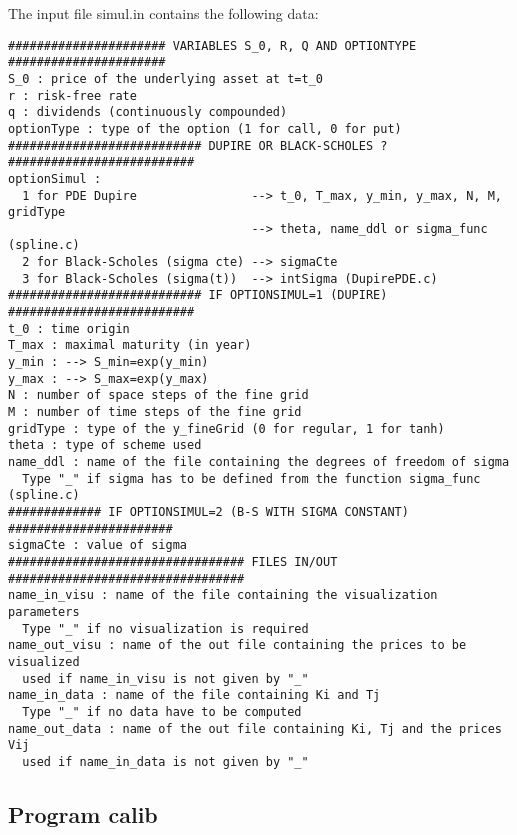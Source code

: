 \documentclass[12pt]{article}
\begin{document}
The input file simul.in contains the following data:
\begin{verbatim}
###################### VARIABLES S_0, R, Q AND OPTIONTYPE ######################
S_0 : price of the underlying asset at t=t_0
r : risk-free rate     
q : dividends (continuously compounded) 
optionType : type of the option (1 for call, 0 for put)  
########################### DUPIRE OR BLACK-SCHOLES ? ##########################
optionSimul :
  1 for PDE Dupire                --> t_0, T_max, y_min, y_max, N, M, gridType
                                  --> theta, name_ddl or sigma_func (spline.c)
  2 for Black-Scholes (sigma cte) --> sigmaCte
  3 for Black-Scholes (sigma(t))  --> intSigma (DupirePDE.c)
########################### IF OPTIONSIMUL=1 (DUPIRE) ##########################
t_0 : time origin
T_max : maximal maturity (in year)
y_min : --> S_min=exp(y_min)     
y_max : --> S_max=exp(y_max)
N : number of space steps of the fine grid
M : number of time steps of the fine grid
gridType : type of the y_fineGrid (0 for regular, 1 for tanh)
theta : type of scheme used
name_ddl : name of the file containing the degrees of freedom of sigma
  Type "_" if sigma has to be defined from the function sigma_func (spline.c)
############# IF OPTIONSIMUL=2 (B-S WITH SIGMA CONSTANT) #######################
sigmaCte : value of sigma
################################# FILES IN/OUT #################################
name_in_visu : name of the file containing the visualization parameters
  Type "_" if no visualization is required
name_out_visu : name of the out file containing the prices to be visualized
  used if name_in_visu is not given by "_"
name_in_data : name of the file containing Ki and Tj
  Type "_" if no data have to be computed
name_out_data : name of the out file containing Ki, Tj and the prices Vij
  used if name_in_data is not given by "_"
\end{verbatim}

\subsection{Program calib}
\label{SSEC:CALIB}
\end{document}
